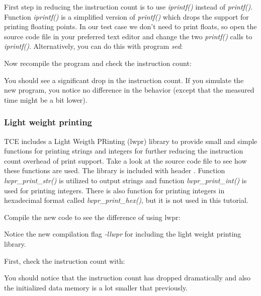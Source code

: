 \documentclass[twoside]{tceusermanual}
\begin{document}
First step in reducing the instruction count is to use
\textit{iprintf()} instead of \textit{printf()}. Function
\textit{iprintf()} is a simplified version of \textit{printf()} which
drops the support for printing floating points. In our test case we
don't need to print floats, so open the source code file
 in your preferred text editor and change the two
\textit{printf()} calls to \textit{iprintf()}. Alternatively, you can
do this with program \textit{sed}:


Now recompile the program and check the instruction count:



You should see a significant drop in the instruction count. If you
simulate the new program, you notice no difference in the behavior
(except that the measured time might be a bit lower).

\subsubsection{Light weight printing}

TCE includes a Light Weigth PRinting (lwpr) library to provide small
and simple functions for printing strings and integers for further
reducing the instruction count overhead of print support. Take a look
at the source code file  to see how these
functions are used. The library is included with header .
Function \textit{lwpr\_print\_str()} is utilized to output strings and
function \textit{lwpr\_print\_int()} is used for printing
integers. There is also function for printing integers in hexadecimal
format called \textit{lwpr\_print\_hex()}, but it is not used in this
tutorial.

Compile the new code to see the difference of using lwpr:


Notice the new compilation flag \textit{-llwpr} for including the light
weight printing library.

First, check the instruction count with:


You should notice that the instruction count has dropped dramatically
and also the initialized data memory is a lot smaller that previously.
\end{document}
